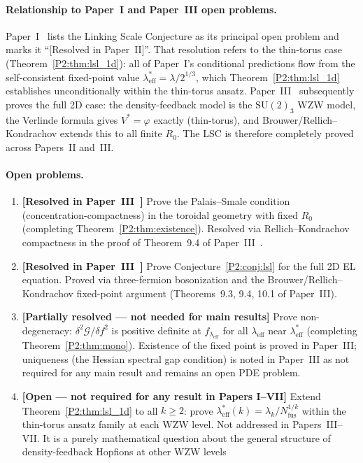 \documentclass[11pt,a4paper]{article}
\newcommand{\vp}{\varphi}
\newcommand{\lam}{\lambda}
\newcommand{\leff}{\lambda_{\mathrm{eff}}}
\newcommand{\G}{\mathcal{G}}
\theoremstyle{remark}
\begin{document}
\paragraph{Relationship to Paper~I and Paper~III open problems.}
Paper~I~\cite{Paper1} lists the Linking Scale Conjecture as its
principal open problem and marks it ``[Resolved in Paper~II]''.
That resolution refers to the thin-torus case
(Theorem~\ref{P2:thm:lsl_1d}): all of Paper~I's conditional predictions
flow from the self-consistent fixed-point value $\leff^*=\lam/2^{1/3}$,
which Theorem~\ref{P2:thm:lsl_1d} establishes unconditionally within
the thin-torus ansatz.
Paper~III~\cite{Paper3} subsequently proves the full 2D case:
the density-feedback model is the $\mathrm{SU}(2)_3$ WZW model,
the Verlinde formula gives $V^*=\vp$ exactly (thin-torus), and
Brouwer/Rellich--Kondrachov extends this to all finite $R_0$.
The LSC is therefore completely proved across Papers~II and~III.

\paragraph{Open problems.}
\begin{enumerate}[noitemsep]
  \item \textbf{[Resolved in Paper~III~\cite{Paper3}]}
    Prove the Palais--Smale condition (concentration-compactness)
    in the toroidal geometry with fixed $R_0$
    (completing Theorem~\ref{P2:thm:existence}).
    Resolved via Rellich--Kondrachov compactness in the proof of
    Theorem~9.4 of Paper~III~\cite{Paper3}.
  \item \textbf{[Resolved in Paper~III~\cite{Paper3}]}
    Prove Conjecture~\ref{P2:conj:lsl} for the full 2D EL equation.
    Proved via three-fermion bosonization and the Brouwer/Rellich--Kondrachov
    fixed-point argument (Theorems~9.3, 9.4, 10.1 of Paper~III).
  \item \textbf{[Partially resolved --- not needed for main results]}
    Prove non-degeneracy:
    $\delta^2\G/\delta f^2$ is positive definite at $f_{\leff}$
    for all $\leff$ near $\leff^*$ (completing Theorem~\ref{P2:thm:mono}).
    Existence of the fixed point is proved in Paper~III; uniqueness
    (the Hessian spectral gap condition) is noted in Paper~III as
    not required for any main result and remains an open PDE problem.
  \item \textbf{[Open — not required for any result in Papers I–VII]}
    Extend Theorem~\ref{P2:thm:lsl_1d} to all $k\geq 2$:
    prove $\leff^*(k) = \lam_k/N_\mathrm{fus}^{1/k}$ within the thin-torus
    ansatz family at each WZW level.
    Not addressed in Papers~III--VII. It is a purely mathematical question about the general structure of density-feedback Hopfions at other WZW levels
\end{enumerate}
\end{document}
